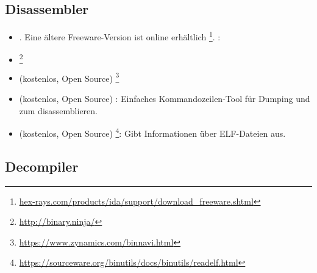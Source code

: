\subsection{Disassembler}


\begin{itemize}
\item {}. Eine ältere Freeware-Version ist online erhältlich
\footnote{\href{http://go.yurichev.com/17031}{hex-rays.com/products/ida/support/download\_freeware.shtml}}.
\ShortHotKeyCheatsheet: 

\item {}\footnote{\url{http://binary.ninja/}}

\item (kostenlos, Open Source) \footnote{\url{https://www.zynamics.com/binnavi.html}}

\item (kostenlos, Open Source) : Einfaches Kommandozeilen-Tool für Dumping und zum disassemblieren.

\item (kostenlos, Open Source) \footnote{\url{https://sourceware.org/binutils/docs/binutils/readelf.html}}:
Gibt Informationen über ELF-Dateien aus.
\end{itemize}

\subsection{Decompiler}

%
%
%
%
%

